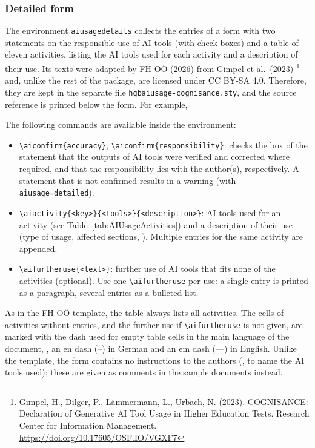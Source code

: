 \documentclass[language=english]{hgbarticle}
\begin{document}
\subsubsection*{Detailed form}

The environment \texttt{aiusagedetails} collects the entries of a form with two statements on the
responsible use of AI tools (with check boxes) and a table of eleven activities, listing the AI tools
used for each activity and a description of their use. Its texts were adapted by FH O\"O (2026) from
Gimpel et al.\ (2023)%
\footnote{Gimpel, H., Dilger, P., L\"ammermann, L., Urbach, N. (2023). COGNISANCE: Declaration of
Generative AI Tool Usage in Higher Education Tests. Research Center for Information Management.
\url{https://doi.org/10.17605/OSF.IO/VGXF7}}
and, unlike the rest of the package, are licensed under CC BY-SA 4.0. Therefore, they are kept in the
separate file \texttt{hgbaiusage-cognisance.sty}, and the source reference is printed below the form.
For example,
%
\begin{LaTeXCode}[numbers=none]
\begin{aiusagedetails}
\end{aiusagedetails}
\end{LaTeXCode}
%
The following commands are available inside the environment:
\begin{itemize}
	\item \verb!\aiconfirm{accuracy}!, \verb!\aiconfirm{responsibility}!: checks the box of the
		statement that the outputs of AI tools were verified and corrected where required, and that
		the responsibility lies with the author(s), respectively. A statement that is not confirmed
		results in a warning (with \texttt{aiusage=detailed}).
	\item \verb!\aiactivity{<key>}{<tools>}{<description>}!: AI tools used for an activity (see
		Table~\ref{tab:AIUsageActivities}) and a description of their use (type of usage, affected
		sections, \etc). Multiple entries for the same activity are appended.
	\item \verb!\aifurtheruse{<text>}!: further use of AI tools that fits none of the activities
		(optional). Use one \verb!\aifurtheruse! per use: a single entry is printed as a paragraph,
		several entries as a bulleted list.
\end{itemize}
%
As in the FH O\"O template, the table always lists all activities. The cells of activities without
entries, and the further use if \verb!\aifurtheruse! is not given, are marked with the dash used for
empty table cells in the main language of the document, \ie, an en dash (--) in German and an em dash
(---) in English. Unlike the template, the form contains no instructions to the authors (\eg, to name
the AI tools used); these are given as comments in the sample documents instead.
\end{document}
